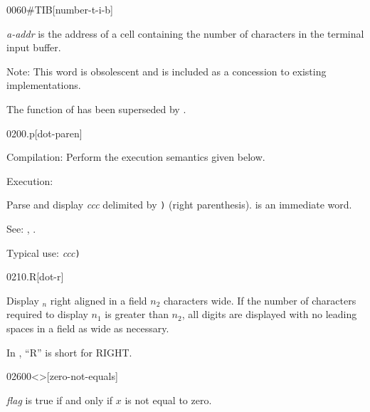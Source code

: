 \begin{newword}[numTIB]{0060}{\#TIB}[number-t-i-b]

	\emph{a-addr} is the address of a cell containing the number
	of characters in the terminal input buffer.

\item[Note:]
	This word is obsolescent and is included as a concession to
	existing implementations.

	\begin{rationale} %
		The function of  has been superseded by
		.
	\end{rationale}
\end{newword}


\begin{newword*}{0200}{.p}[dot-paren]
\item[Compilation:]
	Perform the execution semantics given below.

\item[Execution:]

	Parse and display \emph{ccc} delimited by \texttt{)} (right
	parenthesis).  is an immediate word.

\item[See:]
	,
	.

	\begin{rationale} %
		Typical use:
			 \emph{ccc}\texttt{)}
	\end{rationale}
\end{newword*}


\begin{newword}{0210}{.R}[dot-r]

	Display $_n$ right aligned in a field $n_2$ characters wide. If
	the number of characters required to display $n_1$ is greater
	than $n_2$, all digits are displayed with no leading spaces in
	a field as wide as necessary.

	\begin{rationale} %
		In , ``R'' is short for RIGHT.
	\end{rationale}
\end{newword}


\begin{newword}[0ne]{0260}{0<>}[zero-not-equals]

	\emph{flag} is true if and only if $x$ is not equal to zero.
\end{newword}


